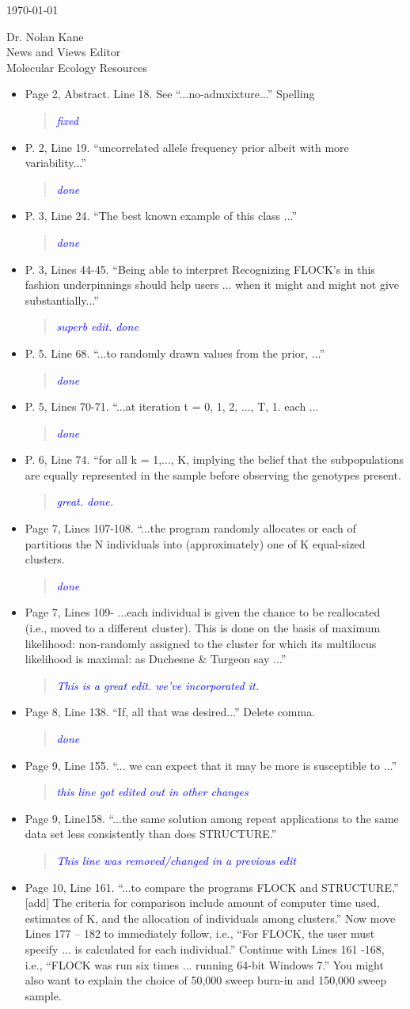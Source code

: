 \documentclass[11pt]{letter}
\newcommand{\reply}[1]{\begin{quotation}\small\sl\textcolor{blue}{#1}\end{quotation}}
\begin{document}
\begin{letter}{ \today 

Dr. Nolan Kane\\
News and Views Editor\\
Molecular Ecology Resources \\
}
\begin{itemize}
\item Page 2, Abstract. Line 18. See ``...no-admxixture...'' Spelling
\reply{fixed}
\item P. 2, Line 19. ``uncorrelated allele frequency prior albeit with more variability...''
\reply{done}
\item P. 3, Line 24. ``The best known example of this class ...''
\reply{done}
\item P. 3, Lines 44-45. ``Being able to interpret Recognizing FLOCK's in this fashion underpinnings should help users ... when it might and might not give substantially...''
\reply{superb edit. done}
\item P. 5. Line 68. ``...to randomly drawn values from the prior, ...''
\reply{done}
\item P. 5, Lines 70-71. ``...at iteration t = 0, 1, 2, ..., T,
1. each ...
\reply{done}
\item P. 6, Line 74. ``for all k = 1,..., K, implying the belief that the subpopulations are equally
represented in the sample before observing the genotypes present.
\reply{great. done.}
\item Page 7, Lines 107-108. ``...the program randomly allocates or each of partitions the N
individuals into (approximately) one of K equal-sized clusters.
\reply{done}
\item Page 7, Lines 109- ...each individual is given the chance to be reallocated (i.e., moved to a different cluster). This is done on the basis of maximum likelihood: non-randomly assigned to the cluster for which its multilocus likelihood is maximal: as Duchesne \& Turgeon say ...''
\reply{This is a great edit. we've incorporated it.}
\item Page 8, Line 138. ``If, all that was desired...'' Delete comma. 
\reply{done}
\item Page 9, Line 155. ``... we can expect that it may be more is susceptible to ...''
\reply{this line got edited out in other changes}
\item Page 9, Line158. ``...the same solution among repeat applications to the same data set less consistently than does STRUCTURE.''
\reply{This line was removed/changed in a previous edit}
\item Page 10, Line 161. ``...to compare the programs FLOCK and STRUCTURE.'' [add] The criteria for comparison include amount of computer time used, estimates of K, and the allocation of individuals among clusters.'' Now move Lines 177 -- 182 to immediately follow, i.e., ``For FLOCK, the user must specify ... is calculated for each individual.'' Continue with Lines 161 -168, i.e., ``FLOCK was run six times ... running 64-bit Windows 7.'' You might also want to explain the choice of 50,000 sweep burn-in and 150,000 sweep sample.

\end{itemize}
\end{letter}
\end{document}
